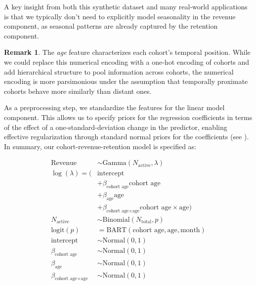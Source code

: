 \documentclass[11pt]{amsart}
\theoremstyle{definition}
\newtheorem{remark}{Remark}
\begin{document}
A key insight from both this synthetic dataset and many real-world applications is that we typically don't need to explicitly
model seasonality in the revenue component, as seasonal patterns are already captured by the retention component.

\begin{remark}
    The {\em age} feature characterizes each cohort's temporal position. While we could replace this numerical encoding with
    a one-hot encoding of cohorts and add hierarchical structure to pool information across cohorts, the numerical encoding
    is more parsimonious under the assumption that temporally proximate cohorts behave more similarly than distant ones.
\end{remark}

As a preprocessing step, we standardize the features for the linear model component. This allows us to specify priors for the
regression coefficients in terms of the effect of a one-standard-deviation change in the predictor, enabling effective
regularization through standard normal priors for the coefficients (see \cite{orduz_retention_bart}). \\

In summary, our cohort-revenue-retention model is specified as:

\begin{align*}
    \text{Revenue}                              & \sim \text{Gamma}(N_{\text{active}}, \lambda)                                      \\
    \log(\lambda) = (                           & \text{intercept}                                                                   \\
                                                & + \beta_{\text{cohort age}} \text{cohort age}                                      \\
                                                & + \beta_{\text{age}} \text{age}                                                    \\
                                                & + \beta_{\text{cohort age} \times \text{age}} \text{cohort age} \times \text{age}) \\
    N_{\text{active}}                           & \sim \text{Binomial}(N_{\text{total}}, p)                                          \\
    \textrm{logit}(p)                           & = \text{BART}(\text{cohort age}, \text{age}, \text{month})                         \\
    \text{intercept}                            & \sim \text{Normal}(0, 1)                                                           \\
    \beta_{\text{cohort age}}                   & \sim \text{Normal}(0, 1)                                                           \\
    \beta_{\text{age}}                          & \sim \text{Normal}(0, 1)                                                           \\
    \beta_{\text{cohort age} \times \text{age}} & \sim \text{Normal}(0, 1)
\end{align*}
\end{document}
